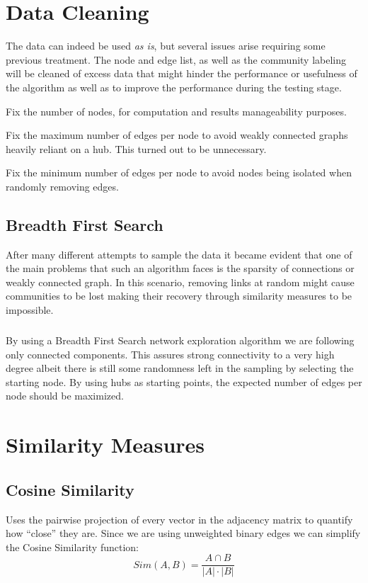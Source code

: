 \documentclass[12pt,a4paper]{report}
\begin{document}
\chapter{Data Cleaning} The data can indeed be used \emph{as is}, but several issues arise requiring some previous treatment. The node and edge list, as well as the community labeling will be cleaned of excess data that might hinder the performance or usefulness of the algorithm as well as to improve the performance during the testing stage.
\begin{list}{•}{}
\item Fix the number of nodes, for computation and results manageability purposes.
\item Fix the maximum number of edges per node to avoid weakly connected graphs heavily reliant on a hub. This turned out to be unnecessary.
\item Fix the minimum number of edges per node to avoid nodes being isolated when randomly removing edges.
\end{list}

\section{Breadth First Search} After many different attempts to sample the data it became evident that one of the main problems that such an algorithm faces is the sparsity of connections or weakly connected graph. In this scenario, removing links at random might cause communities to be lost making their recovery through similarity measures to be impossible.

\paragraph{} By using a Breadth First Search network exploration algorithm we are following only connected components. This assures strong connectivity to a very high degree albeit there is still some randomness left in the sampling by selecting the starting node. By using hubs as starting points, the expected number of edges per node should be maximized.


\chapter{Similarity Measures} 
\section{Cosine Similarity}
Uses the pairwise projection of every vector in the adjacency matrix to quantify how “close” they are. Since we are using unweighted binary edges we can simplify the Cosine Similarity function:
$$Sim(A,B) = \frac{A\cap B}{|A|\cdot |B|}$$
\end{document}
